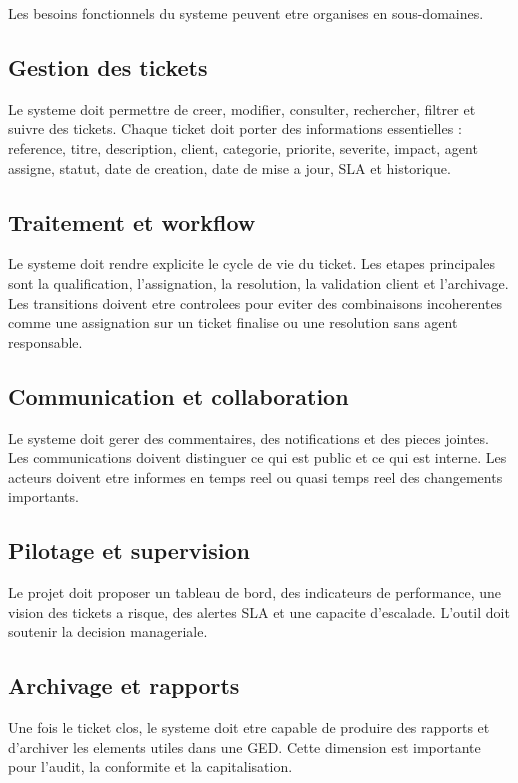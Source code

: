 \documentclass[12pt,a4paper,oneside]{report}
\begin{document}
Les besoins fonctionnels du systeme peuvent etre organises en sous-domaines.

\subsection{Gestion des tickets}

Le systeme doit permettre de creer, modifier, consulter, rechercher, filtrer et suivre des tickets. Chaque ticket doit porter des informations essentielles : reference, titre, description, client, categorie, priorite, severite, impact, agent assigne, statut, date de creation, date de mise a jour, SLA et historique.

\subsection{Traitement et workflow}

Le systeme doit rendre explicite le cycle de vie du ticket. Les etapes principales sont la qualification, l'assignation, la resolution, la validation client et l'archivage. Les transitions doivent etre controlees pour eviter des combinaisons incoherentes comme une assignation sur un ticket finalise ou une resolution sans agent responsable.

\subsection{Communication et collaboration}

Le systeme doit gerer des commentaires, des notifications et des pieces jointes. Les communications doivent distinguer ce qui est public et ce qui est interne. Les acteurs doivent etre informes en temps reel ou quasi temps reel des changements importants.

\subsection{Pilotage et supervision}

Le projet doit proposer un tableau de bord, des indicateurs de performance, une vision des tickets a risque, des alertes SLA et une capacite d'escalade. L'outil doit soutenir la decision manageriale.

\subsection{Archivage et rapports}

Une fois le ticket clos, le systeme doit etre capable de produire des rapports et d'archiver les elements utiles dans une GED. Cette dimension est importante pour l'audit, la conformite et la capitalisation.
\end{document}
